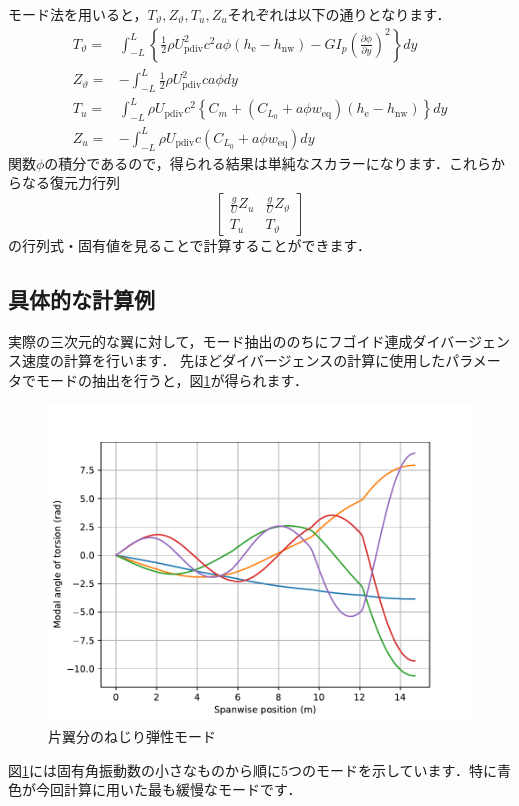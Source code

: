 \documentclass{jarticle}
\begin{document}
モード法を用いると，$T_\vartheta,Z_\vartheta,T_u,Z_u$それぞれは以下の通りとなります．
\begin{align}
    T_\vartheta =& \int_{-L}^{L} \left\{ \frac{1}{2}\rho U_\mathrm{pdiv}^2 c^2 a \phi  (h_\mathrm{e}-h_\mathrm{nw}) - GI_p\left( \frac{\partial \phi}{\partial y} \right)^2 \right\} dy \\
    Z_\vartheta =& -\int_{-L}^L \frac{1}{2}\rho U_\mathrm{pdiv}^2 c a \phi dy \\
    T_u =& \int_{-L}^L \rho U_\mathrm{pdiv} c^2 \left\{ C_m +  (C_{L_0} + a\phi w_\mathrm{eq})  (h_\mathrm{e}-h_\mathrm{nw}) \right\} dy \\
    Z_u =& -\int_{-L}^L \rho U_\mathrm{pdiv} c (C_{L_0} + a\phi w_\mathrm{eq}) dy
\end{align}
関数$\phi$の積分であるので，得られる結果は単純なスカラーになります．これらからなる復元力行列
\begin{equation}
    \begin{bmatrix}
        \frac{g}{U}Z_u & \frac{g}{U}Z_\vartheta \\
        T_u & T_\vartheta
    \end{bmatrix}
\end{equation}
の行列式・固有値を見ることで計算することができます．

\subsection{具体的な計算例}

実際の三次元的な翼に対して，モード抽出ののちにフゴイド連成ダイバージェンス速度の計算を行います．
先ほどダイバージェンスの計算に使用したパラメータでモードの抽出を行うと，図\ref{mode}が得られます．
\begin{figure}[H]
    \centering
    \includegraphics[width=0.7\linewidth]{image/theta_mode.pdf}
    \caption{片翼分のねじり弾性モード}
    \label{mode}
\end{figure}
図\ref{mode}には固有角振動数の小さなものから順に5つのモードを示しています．特に青色が今回計算に用いた最も緩慢なモードです．
\end{document}
